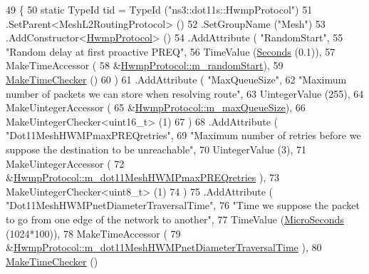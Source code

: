 \begin{DoxyCode}
49 \{
50   \textcolor{keyword}{static} TypeId tid = TypeId (\textcolor{stringliteral}{"ns3::dot11s::HwmpProtocol"})
51     .SetParent<MeshL2RoutingProtocol> ()
52     .SetGroupName (\textcolor{stringliteral}{"Mesh"})
53     .AddConstructor<\hyperlink{classns3_1_1dot11s_1_1HwmpProtocol_afe4408ad645b5c3daebd66391fb27b9d}{HwmpProtocol}> ()
54     .AddAttribute ( \textcolor{stringliteral}{"RandomStart"},
55                     \textcolor{stringliteral}{"Random delay at first proactive PREQ"},
56                     TimeValue (\hyperlink{group__timecivil_ga33c34b816f8ff6628e33d5c8e9713b9e}{Seconds} (0.1)),
57                     MakeTimeAccessor (
58                       &\hyperlink{classns3_1_1dot11s_1_1HwmpProtocol_a5ed9a6e3777b69a28f32eeebfc68c9ea}{HwmpProtocol::m\_randomStart}),
59                     \hyperlink{group__time_ga7032965bd4afa578691d88c09e4481c1}{MakeTimeChecker} ()
60                     )
61     .AddAttribute ( \textcolor{stringliteral}{"MaxQueueSize"},
62                     \textcolor{stringliteral}{"Maximum number of packets we can store when resolving route"},
63                     UintegerValue (255),
64                     MakeUintegerAccessor (
65                       &\hyperlink{classns3_1_1dot11s_1_1HwmpProtocol_ae9573ffc51b306002cc6a7c13132b995}{HwmpProtocol::m\_maxQueueSize}),
66                     MakeUintegerChecker<uint16\_t> (1)
67                     )
68     .AddAttribute ( \textcolor{stringliteral}{"Dot11MeshHWMPmaxPREQretries"},
69                     \textcolor{stringliteral}{"Maximum number of retries before we suppose the destination to be unreachable"},
70                     UintegerValue (3),
71                     MakeUintegerAccessor (
72                       &\hyperlink{classns3_1_1dot11s_1_1HwmpProtocol_afb618f3a22ef3fff0e664fac76040933}{HwmpProtocol::m\_dot11MeshHWMPmaxPREQretries}
      ),
73                     MakeUintegerChecker<uint8\_t> (1)
74                     )
75     .AddAttribute ( \textcolor{stringliteral}{"Dot11MeshHWMPnetDiameterTraversalTime"},
76                     \textcolor{stringliteral}{"Time we suppose the packet to go from one edge of the network to another"},
77                     TimeValue (\hyperlink{group__timecivil_ga17465a639c8d1464e76538afdd78a9f0}{MicroSeconds} (1024*100)),
78                     MakeTimeAccessor (
79                       &\hyperlink{classns3_1_1dot11s_1_1HwmpProtocol_a3f26703a06f87191bec8a9ad3506ca36}{HwmpProtocol::m\_dot11MeshHWMPnetDiameterTraversalTime}
      ),
80                     \hyperlink{group__time_ga7032965bd4afa578691d88c09e4481c1}{MakeTimeChecker} ()

\end{DoxyCode}
